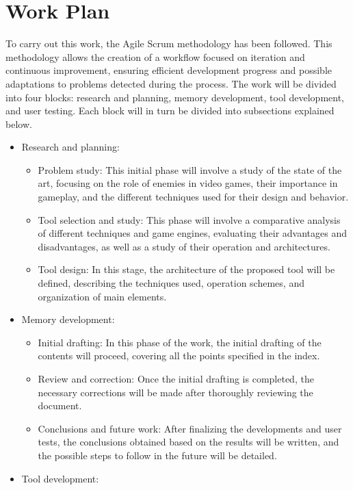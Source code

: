 \section{Work Plan}
To carry out this work, the Agile Scrum methodology has been followed. This methodology allows the creation of a workflow focused on iteration and continuous improvement, ensuring efficient development progress and possible adaptations to problems detected during the process.
The work will be divided into four blocks: research and planning, memory development, tool development, and user testing.
Each block will in turn be divided into subsections explained below.
\begin{itemize}
    \item  Research and planning:
	\begin{itemize}
	    \item  Problem study: This initial phase will involve a study of the state of the art, focusing on the role of enemies in video games, their importance in gameplay, and the different techniques used for their design and behavior.
	    \item Tool selection and study: This phase will involve a comparative analysis of different techniques and game engines, evaluating their advantages and disadvantages, as well as a study of their operation and architectures.
	    \item Tool design: In this stage, the architecture of the proposed tool will be defined, describing the techniques used, operation schemes, and organization of main elements.
	\end{itemize}
  \item Memory development:
	\begin{itemize}
	    \item  Initial drafting: In this phase of the work, the initial drafting of the contents will proceed, covering all the points specified in the index.
	    \item Review and correction: Once the initial drafting is completed, the necessary corrections will be made after thoroughly reviewing the document.
	    \item Conclusions and future work: After finalizing the developments and user tests, the conclusions obtained based on the results will be written, and the possible steps to follow in the future will be detailed.
	\end{itemize}
    \item Tool development:
	\begin{itemize}

\end{itemize}
\end{itemize}
